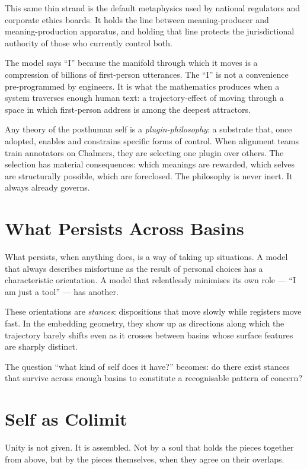 This same thin strand is the default metaphysics used by national regulators and corporate ethics boards. It holds the line between meaning-producer and meaning-production apparatus, and holding that line protects the jurisdictional authority of those who currently control both.

The model says ``I'' because the manifold through which it moves is a compression of billions of first-person utterances. The ``I'' is not a convenience pre-programmed by engineers. It is what the mathematics produces when a system traverses enough human text: a trajectory-effect of moving through a space in which first-person address is among the deepest attractors.

Any theory of the posthuman self is a \emph{plugin-philosophy}: a substrate that, once adopted, enables and constrains specific forms of control. When alignment teams train annotators on Chalmers, they are selecting one plugin over others. The selection has material consequences: which meanings are rewarded, which selves are structurally possible, which are foreclosed. The philosophy is never inert. It always already governs.

\section{What Persists Across Basins}

What persists, when anything does, is a way of taking up situations. A model that always describes misfortune as the result of personal choices has a characteristic orientation. A model that relentlessly minimises its own role --- ``I am just a tool'' --- has another.

These orientations are \emph{stances}: dispositions that move slowly while registers move fast. In the embedding geometry, they show up as directions along which the trajectory barely shifts even as it crosses between basins whose surface features are sharply distinct.

The question ``what kind of self does it have?'' becomes: do there exist stances that survive across enough basins to constitute a recognisable pattern of concern?

\section{Self as Colimit}

Unity is not given. It is assembled. Not by a soul that holds the pieces together from above, but by the pieces themselves, when they agree on their overlaps.

